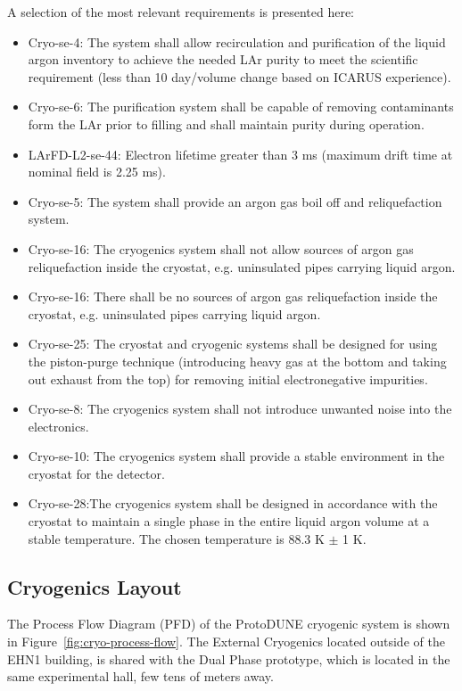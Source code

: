 A selection of the most relevant requirements is presented here:
%
\begin{itemize}
\item Cryo-se-4: The system shall allow recirculation and purification of the liquid argon inventory to achieve the needed LAr purity to meet the scientific requirement (less than 10 day/volume change based on ICARUS experience).
\item  Cryo-se-6: The purification system shall be capable of removing contaminants form the LAr prior to filling and shall maintain purity during operation.
\item  LArFD-L2-se-44: Electron lifetime greater than 3 ms (maximum drift time at nominal field is 2.25 ms).
\item  Cryo-se-5: The system shall provide an argon gas boil off and reliquefaction system.
\item Cryo-se-16: The cryogenics system shall not allow sources of argon gas reliquefaction inside the cryostat, e.g. uninsulated pipes carrying liquid argon.
\item  Cryo-se-16: There shall be no sources of argon gas reliquefaction inside the cryostat, e.g. uninsulated pipes carrying liquid argon.
\item  Cryo-se-25: The cryostat and cryogenic systems shall be designed for using the piston-purge technique (introducing heavy gas at the bottom and taking out exhaust from the top) for removing initial electronegative impurities.
\item  Cryo-se-8: The cryogenics system shall not introduce unwanted noise into the electronics.
\item  Cryo-se-10: The cryogenics system shall provide a stable environment in the cryostat for the detector.
\item  Cryo-se-28:The cryogenics system shall be designed in accordance with the cryostat to maintain a single phase in the entire liquid argon volume at a stable temperature. The chosen temperature is 88.3 K $\pm$ 1 K.
\end{itemize}


\subsection{Cryogenics Layout}

The Process Flow Diagram (PFD) of the ProtoDUNE cryogenic system is shown in Figure~\ref{fig:cryo-process-flow}. The External Cryogenics located outside of the EHN1 building, is shared with the Dual Phase prototype, which is located in the same experimental hall, few tens of meters away.

